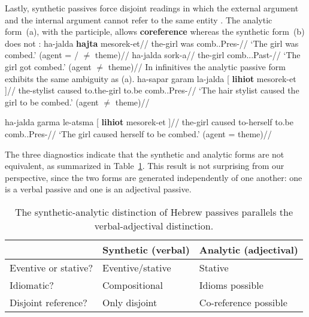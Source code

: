 Lastly, synthetic passives force disjoint readings in which the external argument and the internal argument cannot refer to the same entity \citep{bakeretal89}. The analytic form~(\nextx a), with the participle, allows \textbf{coreference} whereas the synthetic form~(\nextx b) does not \citep[720]{sichel09}:
\pex \label{ex:disjoint}
    \a \begingl
        \gla {}ha-jalda \textbf{hajta} mesorek-et//
        \glb the-girl was comb..Pres-//
        \glft `The girl was combed.' (agent = / $\neq$ theme)//
        \endgl
    \a
        \begingl
        \gla {}ha-jalda sork-a//
        \glb the-girl comb...Past-//
        \glft `The girl got combed.' (agent $\neq$ theme)//
        \endgl
\xe
In infinitives the analytic passive form exhibits the same ambiguity as (\lastx a). 
\pex
	\a 	\begingl
	    \gla ha-sapar garam la-jalda [ \textbf{lihiot} mesorek-et ]//
	    \glb the-stylist caused to.the-girl to.be comb..Pres-//
	    \glft `The hair stylist caused the girl to be combed.' (agent $\neq$ theme)//
	    \endgl

	\a 	\begingl
	    \gla ha-jalda garma le-atsma [ \textbf{lihiot} mesorek-et ]//
	    \glb the-girl caused to-herself to.be comb..Pres-//
	    \glft `The girl caused herself to be combed.' (agent = theme)//
	    \endgl
\xe

The three diagnostics indicate that the synthetic and analytic forms are not equivalent, as summarized in Table~\ref{table:verbal-adjectival}. This result is not surprising from our perspective, since the two forms are generated independently of one another: one is a verbal passive and one is an adjectival passive.

\begin{table}[ht]
\centering
\begin{tabular}{l|ll}
 & Synthetic (verbal) & Analytic (adjectival) \\\hline
 Eventive or stative? & Eventive/stative  & Stative  \\
 Idiomatic? & Compositional  & Idioms possible  \\
 Disjoint reference? & Only disjoint & Co-reference possible  \\
\end{tabular}
\caption{The synthetic-analytic distinction of Hebrew passives parallels the verbal-adjectival distinction. \label{table:verbal-adjectival}}
\end{table}



